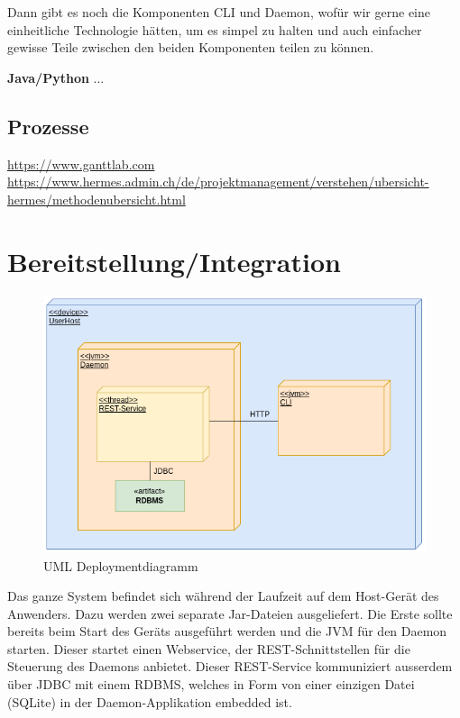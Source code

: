 \documentclass[a4paper,12pt]{report}
\begin{document}
    Dann gibt es noch die Komponenten CLI und Daemon, wofür wir gerne eine einheitliche Technologie hätten,
    um es simpel zu halten und auch einfacher gewisse Teile zwischen den beiden Komponenten teilen zu können.

    \textbf{Java/Python} ...


    \section{Prozesse}
    \url{https://www.ganttlab.com} \\
    \url{https://www.hermes.admin.ch/de/projektmanagement/verstehen/ubersicht-hermes/methodenubersicht.html}


    \chapter{Bereitstellung/Integration}

    \begin{figure}[h]
        \centering
        \includegraphics[width=1\textwidth]{assets/DeplDiagram}
        \caption{UML Deploymentdiagramm}
        \label{fig:depl-diag}
    \end{figure}

    Das ganze System befindet sich während der Laufzeit auf dem Host-Gerät des Anwenders.
    Dazu werden zwei separate Jar-Dateien ausgeliefert.
    Die Erste sollte bereits beim Start des Geräts ausgeführt werden und die JVM für den Daemon starten.
    Dieser startet einen Webservice, der REST-Schnittstellen für die Steuerung des Daemons anbietet.
    Dieser REST-Service kommuniziert ausserdem über JDBC mit einem RDBMS, welches in Form von einer einzigen Datei (SQLite)
    in der Daemon-Applikation embedded ist.
\end{document}
